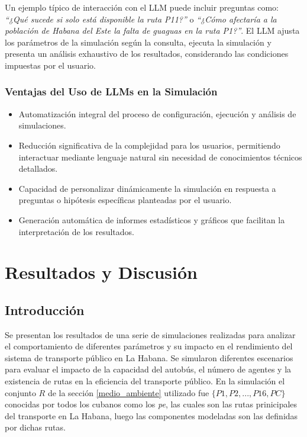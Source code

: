 \documentclass[a4paper,12pt]{article}
\begin{document}
Un ejemplo típico de interacción con el LLM puede incluir preguntas como: \textit{“¿Qué sucede si solo está disponible la ruta P11?”} o \textit{“¿Cómo afectaría a la población de Habana del Este la falta de guaguas en la ruta P1?”}. El LLM ajusta los parámetros de la simulación según la consulta, ejecuta la simulación y presenta un análisis exhaustivo de los resultados, considerando las condiciones impuestas por el usuario.

\subsubsection{Ventajas del Uso de LLMs en la Simulación}
\begin{itemize}
    \item Automatización integral del proceso de configuración, ejecución y análisis de simulaciones.
    \item Reducción significativa de la complejidad para los usuarios, permitiendo interactuar mediante lenguaje natural sin necesidad de conocimientos técnicos detallados.
    \item Capacidad de personalizar dinámicamente la simulación en respuesta a preguntas o hipótesis específicas planteadas por el usuario.
    \item Generación automática de informes estadísticos y gráficos que facilitan la interpretación de los resultados.
\end{itemize}




\section{Resultados y Discusi\'on}

\subsection{Introducción}

Se presentan los resultados de una serie de simulaciones realizadas para analizar el comportamiento de diferentes parámetros y su impacto en el rendimiento del sistema de transporte público en La Habana. Se simularon diferentes escenarios para evaluar el impacto de la capacidad del autobús, el número de agentes y la existencia de rutas en la eficiencia del transporte público. En la simulaci\'on el conjunto $R$ de la secci\'on \ref{medio_ambiente}  utilizado fue $\{P1,P2,...,P16,PC\}$ conocidas por todos los cubanos como los \textit{pe}, las cuales son las rutas prinicipales del transporte en La Habana, luego las componentes modeladas son las definidas por dichas rutas.
\end{document}
